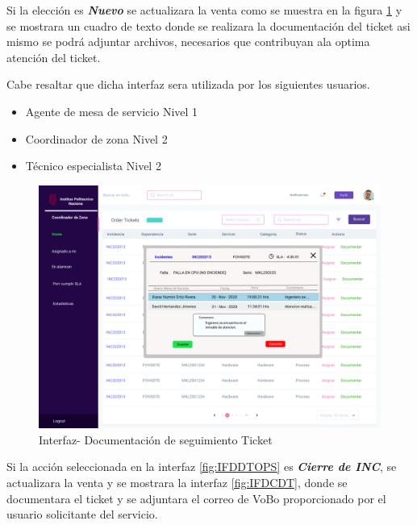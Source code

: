 Si la elección es \textbf{\textit{Nuevo }}  se actualizara la venta como se muestra en la figura \ref{fig:IFDSDTDOC} y se mostrara un cuadro de texto donde se realizara la documentación del ticket asi mismo se podrá adjuntar archivos, necesarios que contribuyan ala optima atención del ticket.

Cabe resaltar que dicha interfaz sera utilizada por los siguientes usuarios. 
\begin{itemize}
	\item Agente de mesa de servicio Nivel 1 
	\item Coordinador de zona Nivel 2
	\item Técnico especialista Nivel 2 
\end{itemize}

	\begin{figure}[H]
	\centering
	\includegraphics[width=1.1\textwidth]{Capitulo4/Img/GestionInc/Documentar-seg}
	\caption{Interfaz- Documentación de seguimiento Ticket}
	\label{fig:IFDSDTDOC}
\end{figure}

Si la acción seleccionada en la interfaz \ref{fig:IFDDTOPS} es \textbf{\textit{Cierre de INC}}, se actualizara la venta y se mostrara la  interfaz \ref{fig:IFDCDT}, donde se documentara el ticket y se adjuntara el correo de VoBo proporcionado por el usuario solicitante del servicio.


